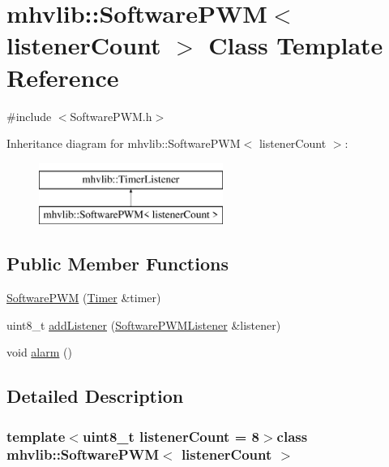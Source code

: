 \hypertarget{classmhvlib_1_1_software_p_w_m}{\section{mhvlib\-:\-:Software\-P\-W\-M$<$ listener\-Count $>$ Class Template Reference}
\label{classmhvlib_1_1_software_p_w_m}
}


{\ttfamily \#include $<$Software\-P\-W\-M.\-h$>$}

Inheritance diagram for mhvlib\-:\-:Software\-P\-W\-M$<$ listener\-Count $>$\-:\begin{figure}[H]
\begin{center}
\leavevmode
\includegraphics[height=2.000000cm]{classmhvlib_1_1_software_p_w_m}
\end{center}
\end{figure}
\subsection*{Public Member Functions}
\begin{DoxyCompactItemize}
\item 
\hyperlink{classmhvlib_1_1_software_p_w_m_a21bd77712032c871ccf4bedfe106fbbe}{Software\-P\-W\-M} (\hyperlink{classmhvlib_1_1_timer}{Timer} \&timer)
\item 
uint8\-\_\-t \hyperlink{classmhvlib_1_1_software_p_w_m_a936918b44eca5e593abca6f608356904}{add\-Listener} (\hyperlink{classmhvlib_1_1_software_p_w_m_listener}{Software\-P\-W\-M\-Listener} \&listener)
\item 
void \hyperlink{classmhvlib_1_1_software_p_w_m_ac450b4de360a9a36abe0d2e65637b524}{alarm} ()
\end{DoxyCompactItemize}


\subsection{Detailed Description}
\subsubsection*{template$<$uint8\-\_\-t listener\-Count = 8$>$class mhvlib\-::\-Software\-P\-W\-M$<$ listener\-Count $>$}



